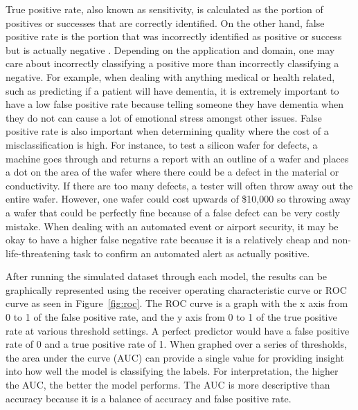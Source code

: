 \documentclass{llncs}
\begin{document}
True positive rate, also known as sensitivity, is calculated as the portion of positives or successes that are correctly identified. On the other hand, false positive rate is the portion that was incorrectly identified as positive or success but is actually negative \cite{pedregosa}. Depending on the application and domain, one may care about incorrectly classifying a positive more than incorrectly classifying a negative.  For example, when dealing with anything medical or health related, such as predicting if a patient will have dementia, it is extremely important to have a low false positive rate because telling someone they have dementia when they do not can cause a lot of emotional stress amongst other issues.  False positive rate is also important when determining quality where the cost of a misclassification is high.  For instance, to test a silicon wafer for defects, a machine goes through and returns a report with an outline of a wafer and places a dot on the area of the wafer where there could be a defect in the material or conductivity.  If there are too many defects, a tester will often throw away out the entire wafer.  However, one wafer could cost upwards of \$10,000 so throwing away a wafer that could be perfectly fine because of a false defect can be very costly mistake.  When dealing with an automated event or airport security, it may be okay to have a higher false negative rate because it is a relatively cheap and non-life-threatening task to confirm an automated alert as actually positive.

After running the simulated dataset through each model, the results can be graphically represented using the receiver operating characteristic curve or ROC curve as seen in Figure~\ref{fig:roc}.  The ROC curve is a graph with the x axis from 0 to 1 of the false positive rate, and the y axis from 0 to 1 of the true positive rate at various threshold settings.  A perfect predictor would have a false positive rate of 0 and a true positive rate of 1.  When graphed over a series of thresholds, the area under the curve (AUC) can provide a single value for providing insight into how well the model is classifying the labels. For interpretation, the higher the AUC, the better the model performs. The AUC is more descriptive than accuracy because it is a balance of accuracy and false positive rate.
\end{document}

